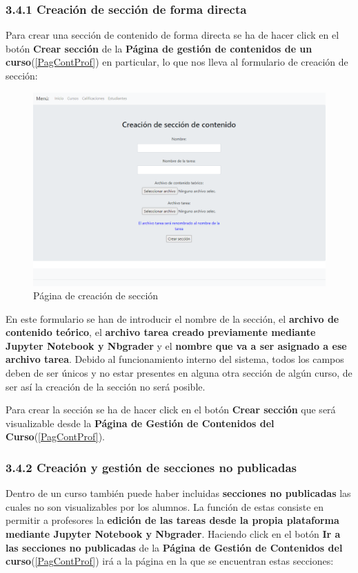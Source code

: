 \subsubsection{3.4.1 Creación de sección de forma directa}
Para crear una sección de contenido de forma directa se ha de hacer click en el botón \textbf{Crear sección} de la \textbf{Página de gestión de contenidos de un curso}(\ref{PagContProf}) en particular, lo que nos lleva al formulario de creación de sección:

\begin{figure}[H]
\centering
\includegraphics[width=\textwidth]{img/imgs-memoria/CrearSeccion.PNG}
\caption{Página de creación de sección}
\end{figure}

En este formulario se han de introducir el nombre de la sección, el \textbf{archivo de contenido teórico}, el \textbf{archivo tarea creado previamente mediante Jupyter Notebook y Nbgrader} y el \textbf{nombre que va a ser asignado a ese archivo tarea}. Debido al funcionamiento interno del sistema, todos los campos deben de ser únicos y no estar presentes en alguna otra sección de algún curso, de ser así la creación de la sección no será posible. 

Para crear la sección se ha de hacer click en el botón \textbf{Crear sección} que será visualizable desde la \textbf{Página de Gestión de Contenidos del Curso}(\ref{PagContProf}).

\subsubsection{3.4.2 Creación y gestión de secciones no publicadas}
Dentro de un curso también puede haber incluidas \textbf{secciones no publicadas} las cuales no son visualizables por los alumnos. La función de estas consiste en permitir a profesores la \textbf{edición de las tareas desde la propia plataforma mediante Jupyter Notebook y Nbgrader}. Haciendo click en el botón \textbf{Ir a las secciones no publicadas} de la \textbf{Página de Gestión de Contenidos del curso}(\ref{PagContProf}) irá a la página en la que se encuentran estas secciones:


